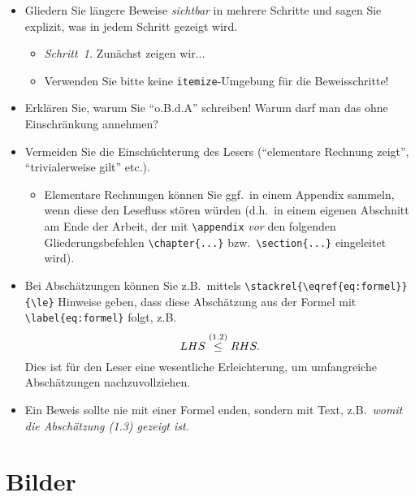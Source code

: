 \documentclass[a4paper,11pt,bibliography=totoc,listof=totoc,headinclude=true,cleardoublepage=empty,oneside]{scrbook}
\begin{document}
{\begin{itemize}
\item Gliedern Sie längere Beweise \emph{sichtbar} in mehrere Schritte und sagen Sie explizit, was in jedem Schritt gezeigt wird.
\begin{itemize}
\item \emph{Schritt~1.} Zunächst zeigen wir...
\item Verwenden Sie bitte keine \verb$itemize$-Umgebung für die Beweisschritte!
\end{itemize}

\item Erklären Sie, warum Sie "`o.B.d.A"' schreiben! Warum darf man das ohne Einschrän\-kung annehmen?

\item Vermeiden Sie die Einschüchterung des Lesers ("`elementare Rechnung zeigt"', "`trivialerweise gilt"' etc.).
\begin{itemize}
\item Elementare Rechnungen können Sie ggf.\ in einem Appendix sammeln, wenn diese den Lesefluss stören würden (d.h.\ in einem eigenen Abschnitt am Ende der Arbeit, der mit \verb$\appendix$ \emph{vor} den folgenden Gliederungsbefehlen \verb$\chapter{...}$ bzw.\ \verb$\section{...}$ eingeleitet wird).
\end{itemize}

\item Bei Abschätzungen können Sie z.B.\ mittels \verb$\stackrel{\eqref{eq:formel}}{\le}$ Hinweise geben, dass diese Abschätzung aus der Formel mit \verb$\label{eq:formel}$ folgt, z.B. 
$$LHS \stackrel{\normalfont(1.2)}{\le} RHS.$$ 
Dies ist für den Leser eine wesentliche Erleichterung, um umfangreiche Abschätzungen nachzuvollziehen.

\item Ein Beweis sollte nie mit einer Formel enden, sondern mit Text, z.B.\ \emph{womit die Abschätzung {\normalfont(1.3)} gezeigt ist.}
\end{itemize}
}

\section{Bilder}
\end{document}
